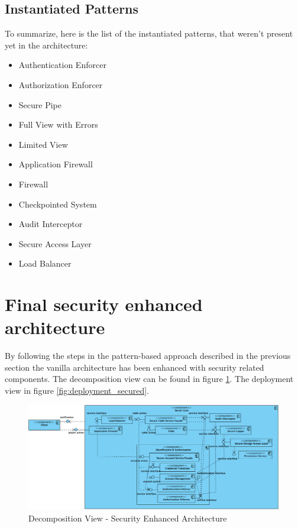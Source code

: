 \documentclass[a4paper,11pt]{report}
\begin{document}
\subsection{Instantiated Patterns}
To summarize, here is the list of the instantiated patterns, that weren't present yet in the architecture:
\begin{itemize}
\item Authentication Enforcer
\item Authorization Enforcer
\item Secure Pipe
\item Full View with Errors
\item Limited View
\item Application Firewall
\item Firewall
\item Checkpointed System
\item Audit Interceptor
\item Secure Access Layer
\item Load Balancer
\end{itemize}

\section{Final security enhanced architecture}
By following the steps in the pattern-based approach described in the previous section the vanilla architecture has been enhanced with security related components. The decomposition view can be found in figure \ref{fig:decomposition_secured}. The deployment view in figure \ref{fig:deployment_secured}.

\begin{figure}[htpb]
  \begin{center}
    \includegraphics[angle=90,scale=0.65]{component_secured.png}
  \end{center}
  \caption{Decomposition View - Security Enhanced Architecture}\label{fig:decomposition_secured}
\end{figure}
\end{document}
